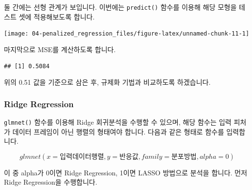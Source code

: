 \documentclass[12pt,]{book}
\newenvironment{Shaded}{\begin{snugshade}}{\end{snugshade}}
\newcommand{\DataTypeTok}[1]{\textcolor[rgb]{0.13,0.29,0.53}{#1}}
\newcommand{\DecValTok}[1]{\textcolor[rgb]{0.00,0.00,0.81}{#1}}
\newcommand{\KeywordTok}[1]{\textcolor[rgb]{0.13,0.29,0.53}{\textbf{#1}}}
\newcommand{\NormalTok}[1]{#1}
\newcommand{\OperatorTok}[1]{\textcolor[rgb]{0.81,0.36,0.00}{\textbf{#1}}}
\newcommand{\StringTok}[1]{\textcolor[rgb]{0.31,0.60,0.02}{#1}}
\begin{document}
둘 간에는 선형 관계가 보입니다. 이번에는 \texttt{predict()} 함수를 이용해 해당 모형을 테스트 셋에 적용해보도록 합니다.

\begin{Shaded}
\end{Shaded}

\begin{center}\texttt{[image: 04-penalized\_regression\_files/figure-latex/unnamed-chunk-11-1]} \end{center}

마지막으로 MSE를 계산하도록 합니다.

\begin{Shaded}
\end{Shaded}

\begin{verbatim}
## [1] 0.5084
\end{verbatim}

위의 0.51 값을 기준으로 삼은 후, 규제화 기법과 비교하도록 하겠습니다.

\hypertarget{ridge-regression}{%
\subsubsection{Ridge Regression}\label{ridge-regression}}

\texttt{glmnet()} 함수를 이용해 Ridge 회귀분석을 수행할 수 있으며, 해당 함수는 입력 피처가 데이터 프레임이 아닌 행렬의 형태여야 합니다. 다음과 같은 형태로 함수를 입력합니다.

\[glmnet(x = 입력 데이터 행렬, y = 반응값, family = 분포 방법, alpha = 0)\]

이 중 alpha가 0이면 Ridge Regression, 1이면 LASSO 방법으로 분석을 합니다. 먼저 Ridge Regression을 수행합니다.
\end{document}
